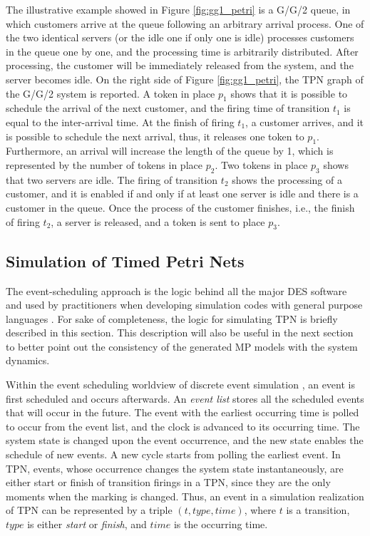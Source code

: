 \documentclass[suppldata]{interact}
\theoremstyle{plain}
\theoremstyle{definition}
\theoremstyle{remark}
\begin{document}
The illustrative example showed in Figure \ref{fig:gg1_petri} is a G/G/2 queue, in which customers arrive at the queue following an arbitrary arrival process. One of the two identical servers (or the idle one if only one is idle) processes customers in the queue one by one, and the processing time is arbitrarily distributed. After processing, the customer will be immediately released from the system, and the server becomes idle. On the right side of Figure \ref{fig:gg1_petri}, the TPN graph of the G/G/2 system is %
reported. A token in place $p_1$ shows that it is possible to schedule the arrival of the next customer, and the firing time of transition $t_1$ is equal to the inter-arrival time. At the finish of firing $t_1$, a customer arrives, and it is possible to schedule the next arrival, thus, it releases one token to $p_1$. Furthermore, an arrival will increase the length of the queue by 1, which is represented by the number of tokens in place $p_2$. Two tokens in place $p_3$ shows that two servers are idle. The firing of transition $t_2$ shows the processing of a customer, and it is enabled if and only if at least one server is idle and there is a customer in the queue. Once the process of the customer finishes, i.e., the finish of firing $t_2$, a server is released, and a token is sent to place $p_3$.


\subsection{Simulation of Timed Petri Nets}\label{sec:ModelSim}
The event-scheduling approach is the logic behind all the major DES software and used by practitioners when developing simulation codes with general purpose languages \citep{law2014simulation}. For sake of completeness, the logic for simulating TPN is briefly described in this section. This description will also be useful in the next section to better point out the consistency of the generated MP models with the system dynamics. 

Within the event scheduling worldview of discrete event simulation \citep{zeigler2018theory}, an event is first scheduled and occurs afterwards. 
An \textit{event list} stores all the scheduled events that will occur in the future. The event with the earliest occurring time is polled to occur from the event list, and the clock is advanced to its occurring time. The system state is changed upon the event occurrence, and the new state enables the schedule of new events. A new cycle starts from polling the earliest event. In TPN, events, whose occurrence changes the system state instantaneously, are either start or finish of transition firings in a TPN, since they are the only moments when the marking is changed. Thus, an event in a simulation realization of TPN can be represented by a triple $(t,type,time)$, where $t$ is a transition, $type$ is either \textit{start} or \textit{finish}, and $time$ is the occurring time. 
\end{document}
